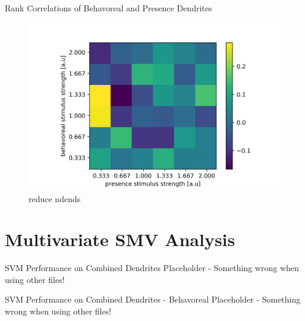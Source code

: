 \documentclass[10pt]{beamer}
\begin{document}
\begin{frame}[fragile]{Rank Correlations of Behavoreal and Presence Dendrites}
\begin{center}
	\begin{figure}
	\caption*{reduce ndends}
      \includegraphics[width=1.0\textwidth]{transrank.png}
	\end{figure}
	\end{center}
\end{frame}

\section{Multivariate SMV Analysis}

\begin{frame}[fragile]{SVM Performance on Combined Dendrites}
Placeholder - Something wrong when using other files!
\end{frame}

\begin{frame}[fragile]{SVM Performance on Combined Dendrites - Behavoreal}
Placeholder - Something wrong when using other files!
\end{frame}
\end{document}
